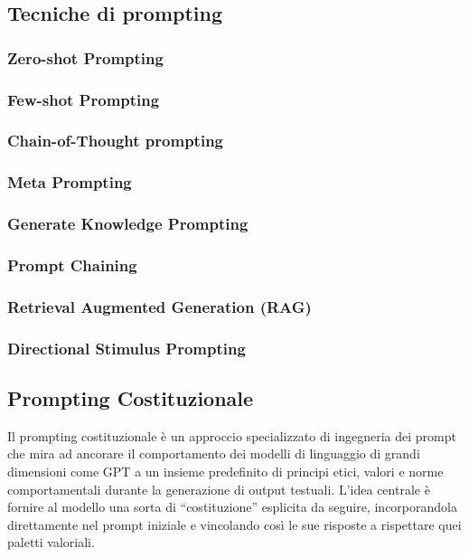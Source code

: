     \subsection{Tecniche di prompting}
        \subsubsection{Zero-shot Prompting}
        \subsubsection{Few-shot Prompting}
        \subsubsection{Chain-of-Thought prompting}
        \subsubsection{Meta Prompting}
        \subsubsection{Generate Knowledge Prompting}
        \subsubsection{Prompt Chaining}
        \subsubsection{Retrieval Augmented Generation (RAG)}
        \subsubsection{Directional Stimulus Prompting}
        
    \subsection{Prompting Costituzionale}
        Il prompting costituzionale è un approccio specializzato di ingegneria dei prompt che mira ad ancorare il comportamento dei modelli di linguaggio di grandi dimensioni come GPT a un insieme predefinito di principi etici, valori e norme comportamentali durante la generazione di output testuali. L'idea centrale è fornire al modello una sorta di ``costituzione'' esplicita da seguire, incorporandola direttamente nel prompt iniziale e vincolando così le sue risposte a rispettare quei paletti valoriali.

